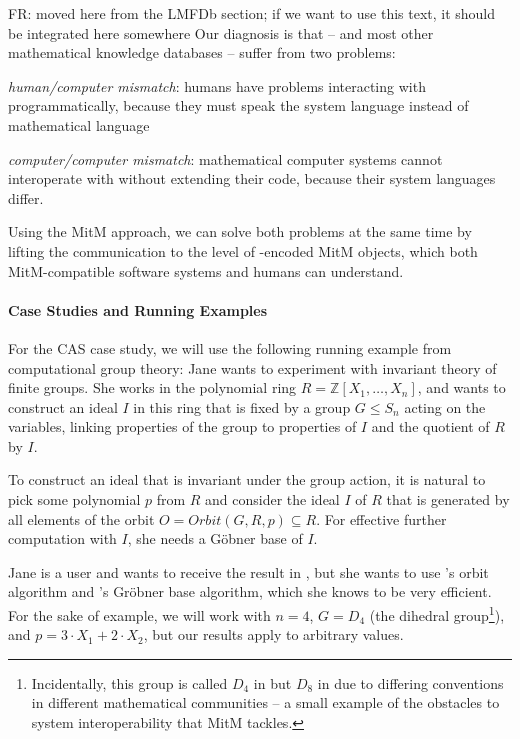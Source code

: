 \begin{oldpart}{FR: moved here from the LMFDb section; if we want to use this text, it should be integrated here somewhere}
Our diagnosis is that {\lmfdb} -- and most other mathematical knowledge databases -- suffer from two problems:
\begin{compactitem}
\item \emph{human/computer mismatch}: humans have problems interacting with \lmfdb programmatically, because they must speak the system language instead of mathematical language
\item \emph{computer/computer mismatch}: mathematical computer systems cannot interoperate with \lmfdb without extending their code, because their system languages differ.
\end{compactitem}
Using the MitM approach, we can solve both problems at the same time by lifting the communication to the level of \ommt-encoded MitM objects, which both MitM-compatible software systems and humans can understand.
\end{oldpart}

\paragraph{Case Studies and Running Examples}
For the CAS case study, we will use the following running example from computational group theory: Jane wants to experiment with invariant theory of finite groups.
She works in the polynomial ring $R=\mathbb{Z}[X_1,\ldots,X_n]$, and wants to construct an ideal $I$ in this ring that is fixed by a group $G \leq S_n$ acting on the variables, linking properties of the group to properties of $I$ and the quotient of $R$ by $I$.

To construct an ideal that is invariant
under the group action, it is natural to pick some polynomial $p$ from $R$
and consider the ideal $I$ of $R$ that is generated by all elements of the orbit
$O=Orbit(G,R,p)\subseteq R$.
For effective further computation with $I$, she needs a G\"obner base of $I$.

Jane is a \Sage user and wants to receive the result in \Sage, but she wants to
use \GAP's orbit algorithm and \Singular's Gr\"obner base algorithm, which she
knows to be very efficient. For the sake of example, we will work with $n=4$,
$G=D_4$ (the dihedral group\footnote{Incidentally, this group is called $D_4$ in
\Sage but $D_8$ in \GAP due to differing conventions in different mathematical
communities -- a small example of the obstacles to system interoperability that
MitM tackles.}), and $p=3\cdot X_1+2\cdot X_2$, but our results apply to
arbitrary values.

